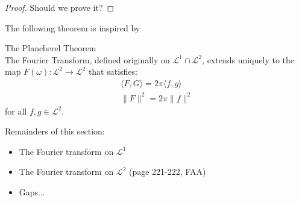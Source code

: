 \begin{proof}
Should we prove it?
\end{proof}

\noindent
The following theorem is inspired by \cite{page 222, FAA}
\begin{theorem}{The Plancherel Theorem}
\\
The Fourier Transform, defined originally on $\mathcal{L}^1 \cap \mathcal{L}^2$, extends uniquely to the map $F(\omega): \mathcal{L}^2 \to \mathcal{L}^2$ that satisfies:
\begin{align*}
\langle F, G \rangle = 2\pi \langle f,g \rangle \\
\|F\|^2  = 2\pi \|f\|^2
\end{align*}
for all $f,g \in \mathcal{L}^2$.
\end{theorem}

\noindent
Remainders of this section:
\begin{itemize}
\item The Fourier transform on $\mathcal{L}^1$
\item The Fourier transform on $\mathcal{L}^2$ (page 221-222, FAA)
\item Gaps...
\end{itemize}